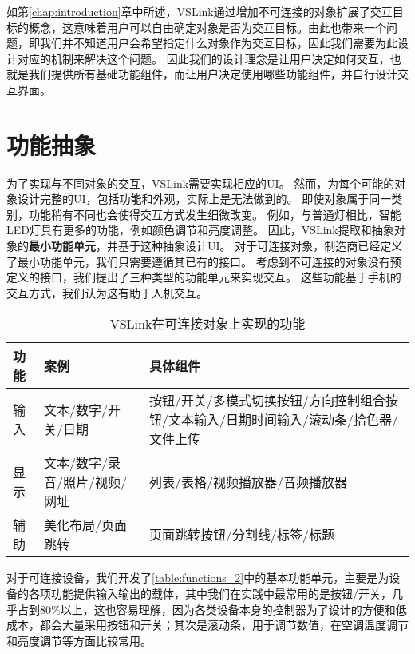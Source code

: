 如第\ref{chap:introduction}章中所述，VSLink通过增加不可连接的对象扩展了交互目标的概念，这意味着用户可以自由确定对象是否为交互目标。由此也带来一个问题，即我们并不知道用户会希望指定什么对象作为交互目标，因此我们需要为此设计对应的机制来解决这个问题。
因此我们的设计理念是让用户决定如何交互，也就是我们提供所有基础功能组件，而让用户决定使用哪些功能组件，并自行设计交互界面。

\section{功能抽象}
为了实现与不同对象的交互，VSLink需要实现相应的UI。
然而，为每个可能的对象设计完整的UI，包括功能和外观，实际上是无法做到的。
即使对象属于同一类别，功能稍有不同也会使得交互方式发生细微改变。
例如，与普通灯相比，智能LED灯具有更多的功能，例如颜色调节和亮度调整。
因此，VSLink提取和抽象对象的\textbf{最小功能单元}，并基于这种抽象设计UI。
对于可连接对象，制造商已经定义了最小功能单元，我们只需要遵循其已有的接口。
考虑到不可连接的对象没有预定义的接口，我们提出了三种类型的功能单元来实现交互。
这些功能基于手机的交互方式，我们认为这有助于人机交互。

\vspace{-1em}
\begin{table}[htbp]
	\caption{VSLink在可连接对象上实现的功能}  \label{table:functions_2} 
	\begin{center}  
		\begin{tabular}{|m{1cm}<{\centering}|m{6cm}<{\centering}|m{8cm}<{\centering}|}  
			\hline  
			\textbf{功能} & \textbf{案例} &\textbf{具体组件}\\ \hline  
			输入 & 文本/数字/开关/日期 & 按钮/开关/多模式切换按钮/方向控制组合按钮/文本输入/日期时间输入/滚动条/拾色器/文件上传 \\ \hline 
			显示 & 文本/数字/录音/照片/视频/网址 & 列表/表格/视频播放器/音频播放器  \\ \hline
			辅助 & 美化布局/页面跳转 & 页面跳转按钮/分割线/标签/标题 \\ \hline
		\end{tabular}  
	\end{center}  
\end{table}

对于可连接设备，我们开发了\autoref{table:functions_2}中的基本功能单元，主要是为设备的各项功能提供输入输出的载体，其中我们在实践中最常用的是按钮/开关，几乎占到80\%以上，这也容易理解，因为各类设备本身的控制器为了设计的方便和低成本，都会大量采用按钮和开关；其次是滚动条，用于调节数值，在空调温度调节和亮度调节等方面比较常用。


